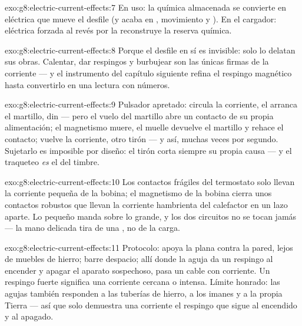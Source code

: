\begin{solution}{exo:g8:electric-current-effects:7}
En uso: la  química almacenada se convierte en
 eléctrica que mueve el desfile (y acaba en ,
movimiento y ). En el cargador:  eléctrica forzada al
revés por la  reconstruye la reserva química.
\end{solution}

\begin{solution}{exo:g8:electric-current-effects:8}
Porque el desfile en sí es invisible: solo lo delatan sus obras.
Calentar, dar respingos y burbujear son las únicas firmas de la
corriente --- y el instrumento del capítulo siguiente refina el
respingo magnético hasta convertirlo en una lectura con números.
\end{solution}

\begin{solution}{exo:g8:electric-current-effects:9}
Pulsador apretado: circula la corriente, el  arranca el
martillo, din --- pero el vuelo del martillo abre un contacto de su
propia alimentación; el magnetismo muere, el muelle devuelve el
martillo y rehace el contacto; vuelve la corriente, otro tirón --- y
así, muchas veces por segundo. Sujetarlo es imposible por diseño: el
tirón corta siempre su propia causa --- y el traqueteo \emph{es} el
 del timbre.
\end{solution}

\begin{solution}{exo:g8:electric-current-effects:10}
Los contactos frágiles del termostato solo llevan la corriente
pequeña de la bobina; el magnetismo de la bobina cierra unos contactos
robustos que llevan la corriente hambrienta del calefactor en un lazo
aparte. Lo pequeño manda sobre lo grande, y los dos circuitos no se
tocan jamás --- la mano delicada tira de una , no de la
carga.
\end{solution}

\begin{solution}{exo:g8:electric-current-effects:11}
Protocolo: apoya la  plana contra la pared, lejos de muebles
de hierro; barre despacio; allí donde la aguja da un respingo al
encender y apagar el aparato sospechoso, pasa un cable con corriente.
Un respingo fuerte significa una corriente cercana o intensa. Límite
honrado: las agujas también responden a las tuberías de hierro, a los
imanes y a la propia Tierra --- así que solo demuestra una
corriente el respingo que sigue al encendido y al apagado.
\end{solution}

